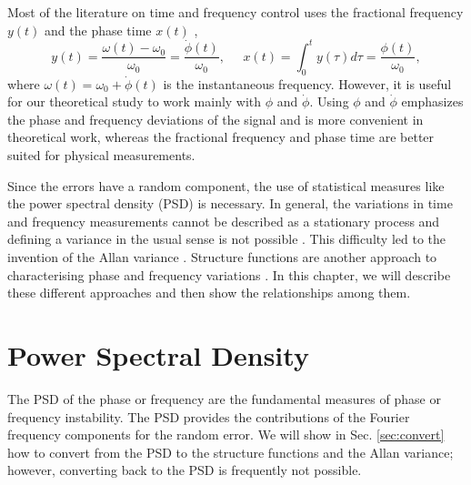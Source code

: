 Most of the literature on time and frequency control uses the fractional frequency $y(t)$ and the phase time $x(t)$ \cite{Kartaschoff1978, Allan1974, Riley1994},
%
\begin{equation}
\label{eq:phasefreqquantities}
y(t) = \frac{\omega(t) - \omega_0}{\omega_0} = \frac{\dot{\phi}(t)}{\omega_0}, \;\;\;\;\; x(t) = \int_0^t y(\tau)d\tau = \frac{\phi(t)}{\omega_0},
\end{equation}
%
where $\omega(t) = \omega_0 + \dot{\phi}(t)$ is the instantaneous frequency. However, it is useful for our theoretical study to work mainly with $\phi$ and $\dot{\phi}$. Using $\phi$ and $\dot{\phi}$ emphasizes the phase and frequency deviations of the signal and is more convenient in theoretical work, whereas the fractional frequency and phase time are better suited for physical measurements.

Since the errors have a random component, the use of statistical measures like the power spectral density (PSD) is necessary. In general, the variations in time and frequency measurements cannot be described as a stationary process and defining a variance in the usual sense is not possible \cite{Allan1974, blair1974time}. This difficulty led to the invention of the Allan variance \cite{Allan1974, blair1974time}. Structure functions are another approach to characterising phase and frequency variations \cite{Lindsey1976}. In this chapter, we will describe these different approaches and then show the relationships among them.

\section{Power Spectral Density} \label{sec:psd}

The PSD of the phase or frequency are the fundamental measures of phase or frequency instability. The PSD provides the contributions of the Fourier frequency components for the random error. We will show in Sec. \ref{sec:convert} how to convert from the PSD to the structure functions and the Allan variance; however, converting back to the PSD is frequently not possible.


